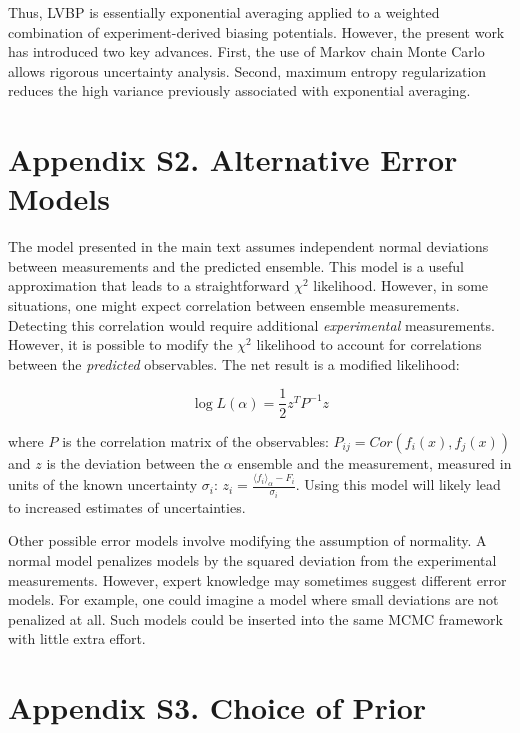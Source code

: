 \documentclass[journal=jacsat,manuscript=article]{achemso}
\begin{document}
Thus, LVBP is essentially exponential averaging applied to a weighted combination of experiment-derived biasing potentials.  However, the present work has introduced two key advances.  First, the use of Markov chain Monte Carlo allows rigorous uncertainty analysis.  Second, maximum entropy regularization reduces the high variance previously associated with exponential averaging.  

\section{Appendix S2.  Alternative Error Models}

The model presented in the main text assumes independent normal deviations between measurements and the predicted ensemble.  This model is a useful approximation that leads to a straightforward $\chi^2$ likelihood.  However, in some situations, one might expect correlation between ensemble measurements.  Detecting this correlation would require additional \emph{experimental} measurements.  However, it is possible to modify the $\chi^2$ likelihood to account for correlations between the \emph{predicted} observables.  The net result is a modified likelihood:

$$\log L(\alpha) = \frac{1}{2} z^T P^{-1} z$$

where $P$ is the correlation matrix of the observables: $P_{ij} = Cor(f_i(x), f_j(x))$ and $z$ is the deviation between the $\alpha$ ensemble and the measurement, measured in units of the known uncertainty $\sigma_i$: $z_i = \frac{\langle f_i\rangle _\alpha - F_i}{\sigma_i}$.  Using this model will likely lead to increased estimates of uncertainties.  

Other possible error models involve modifying the assumption of normality.  A normal model penalizes models by the squared deviation from the experimental measurements.  However, expert knowledge may sometimes suggest different error models.  For example, one could imagine a model where small deviations are not penalized at all.  Such models could be inserted into the same MCMC framework with little extra effort.


\section{Appendix S3.  Choice of Prior}
\end{document}
